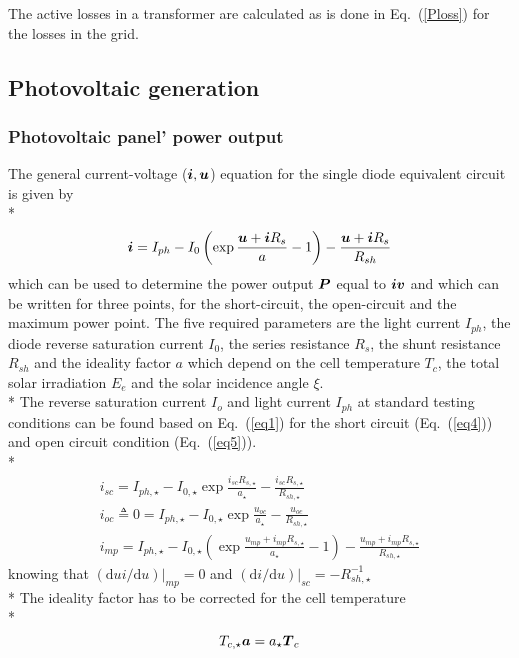 The active losses in a transformer are calculated as is done in Eq.~(\ref{Ploss}) for the losses in the grid. 

\subsection{Photovoltaic generation}

\subsubsection{Photovoltaic panel' power output}

The general current-voltage ($\boldsymbol{i},\boldsymbol{u}$) equation for the single diode equivalent circuit is given by \\*
\begin{equation}
\boldsymbol{i} = I_{ph} - I_{0} \left(\exp \frac{\boldsymbol{u} + \boldsymbol{i} R_{s}}{a} - 1 \right) - \frac{\boldsymbol{u} + \boldsymbol{i} R_{s}}{R_{sh}} \label{eq1}
\end{equation}
which can be used to determine the power output $\boldsymbol{P}$ equal to $\boldsymbol{i} \boldsymbol{v}$ and which can be written for three points, \ie for the short-circuit, the open-circuit and the maximum power point\citep{sera}. The five required parameters are the light current $I_{ph}$, the diode reverse saturation current $I_{0}$, the series resistance $R_{s}$, the shunt resistance $R_{sh}$ and the ideality factor $a$ which depend on the cell temperature $T_{c}$, the total solar irradiation $E_{e}$ and the solar incidence angle $\xi$. \\*
%
The reverse saturation current $I_{o}$ and light current $I_{ph}$ at standard testing conditions can be found based on Eq.~(\ref{eq1}) for the short circuit (Eq.~(\ref{eq4})) and open circuit condition (Eq.~(\ref{eq5})).\\*
\begin{gather}
i_{sc} = I_{ph,\star} - I_{0,\star} \exp \frac{i_{sc} R_{s,\star}}{a_{\star}} - \frac{i_{sc} R_{s,\star}}{R_{sh,\star}} \label{eq4} \\
i_{oc} \triangleq 0 = I_{ph,\star} - I_{0,\star} \exp \frac{u_{oc}}{a_{\star}} - 
\frac{u_{oc}}{R_{sh,\star}}  \label{eq5} \\
i_{mp} = I_{ph,\star} - I_{0,\star} \left(\exp \frac{u_{mp} + i_{mp} R_{s,\star}}{a_{\star}} - 1 \right) - \frac{u_{mp} + i_{mp} R_{s,\star}}{R_{sh,\star}} \label{eq6}
\end{gather}
knowing that $(\mbox{d}ui / \mbox{d}u)\vert_{mp} = 0$ and $(\mbox{d}i / \mbox{d}u)\vert_{sc} = - R_{sh,\star}^{-1}$ \\*
%
The ideality factor has to be corrected for the cell temperature\\*
\begin{equation}
T_{c,\star} \boldsymbol{a} = a_{\star} \boldsymbol{T}_{c} 
\end{equation}

